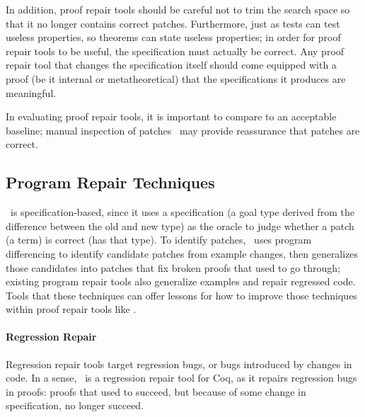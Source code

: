 In addition, proof repair tools should be careful not to trim the search space so that it no
longer contains correct patches.
Furthermore, just as tests can test useless properties, so theorems can state useless properties;
in order for proof repair tools to be useful, the specification must actually be correct.
Any proof repair tool that changes the specification itself should come equipped with a proof (be it 
internal or metatheoretical) that the specifications it produces are meaningful.

In evaluating proof repair tools, it is important to compare to an acceptable baseline; 
manual inspection of patches~\cite{DBLP:journals/corr/abs-1811-02429} 
may provide reassurance that patches are correct.

\subsection{Program Repair Techniques}
\label{sec:techniques}

\sysname\ is specification-based, since it uses a specification (a goal type derived from the difference
between the old and new type) as the oracle to judge whether a patch (a term) is correct (has that type). To identify
patches, \sysname\ uses program differencing to identify candidate patches from example changes, 
then generalizes those candidates into patches that fix broken proofs that used to go through; existing program repair tools also generalize
examples and repair regressed code.
Tools that these techniques can offer lessons for how to improve those techniques within proof repair tools like \sysname.

\paragraph{Regression Repair} Regression repair tools target regression bugs,
or bugs introduced by changes in code.
In a sense, \sysname\ is a regression repair tool for Coq, as it repairs regression bugs in proofs:
proofs that used to succeed, but because of some change in specification, no longer succeed.

